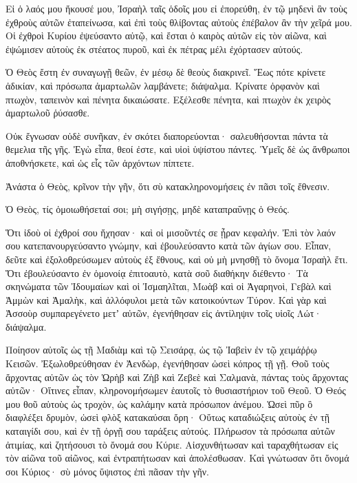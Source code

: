 \begin{spacing}{1.1}
\begin{multicols}{2}
Εἰ ὁ λαός μου ἤκουσέ μου, Ἰσραὴλ ταῖς ὁδοῖς μου εἰ ἐπορεύθη,
ἐν τῷ μηδενὶ ἂν τοὺς ἐχθροὺς αὐτῶν ἐταπείνωσα, καὶ ἐπὶ τοὺς θλίβοντας αὐτοὺς ἐπέβαλον ἂν τὴν χεῖρά μου.
Οἱ ἐχθροὶ Κυρίου ἐψεύσαντο αὐτῷ, καὶ ἔσται ὁ καιρὸς αὐτῶν εἰς τὸν αἰῶνα,
καὶ ἐψώμισεν αὐτοὺς ἐκ στέατος πυροῦ, καὶ ἐκ πέτρας μέλι ἐχόρτασεν αὐτούς.

Ὁ Θεὸς ἔστη ἐν συναγωγῇ θεῶν, ἐν μέσῳ δὲ θεοὺς διακρινεῖ.
Ἕως πότε κρίνετε ἀδικίαν, καὶ πρόσωπα ἁμαρτωλῶν λαμβάνετε; διάψαλμα.
Κρίνατε ὀρφανὸν καὶ πτωχὸν, ταπεινὸν καὶ πένητα δικαιώσατε.
Εξέλεσθε πένητα, καὶ πτωχὸν ἐκ χειρὸς ἁμαρτωλοῦ ῥύσασθε.

Οὐκ ἔγνωσαν οὐδὲ συνῆκαν, ἐν σκότει διαπορεύονται· σαλευθήσονται πάντα τὰ θεμελια τῆς γῆς.
Ἐγὼ εἶπα, θεοί ἐστε, καὶ υἱοὶ ὑψίστου πάντες.
Ὑμεῖς δὲ ὡς ἄνθρωποι ἀποθνήσκετε, καὶ ὡς εἷς τῶν ἀρχόντων πίπτετε.

Ἀνάστα ὁ Θεὸς, κρῖνον τὴν γῆν, ὅτι σὺ κατακληρονομήσεις ἐν πᾶσι τοῖς ἔθνεσιν.

Ὁ Θεὸς, τίς ὁμοιωθήσεταί σοι; μὴ σιγήσῃς, μηδὲ καταπραΰνῃς ὁ Θεός.

Ὅτι ἰδοὺ οἱ ἐχθροί σου ἤχησαν· καὶ οἱ μισοῦντές σε ᾖραν κεφαλήν.
Ἐπὶ τὸν λαόν σου κατεπανουργεύσαντο γνώμην, καὶ ἐβουλεύσαντο κατὰ τῶν ἁγίων σου.
Εἶπαν, δεῦτε καὶ ἐξολοθρεύσωμεν αὐτοὺς ἐξ ἔθνους, καὶ οὐ μὴ μνησθῇ τὸ ὄνομα Ἰσραὴλ ἔτι.
Ὅτι ἐβουλεύσαντο ἐν ὁμονοίᾳ ἐπιτοαυτὸ, κατὰ σοῦ διαθήκην διέθεντο·
Τὰ σκηνώματα τῶν Ἰδουμαίων καὶ οἱ Ἰσμαηλῖται, Μωὰβ καὶ οἱ Ἀγαρηνοὶ,
Γεβὰλ καὶ Ἀμμὼν καὶ Ἀμαλὴκ, καὶ ἀλλόφυλοι μετὰ τῶν κατοικούντων Τύρον.
Καὶ γὰρ καὶ Ἀσσοὺρ συμπαρεγένετο μετʼ αὐτῶν, ἐγενήθησαν εἰς ἀντίληψιν τοῖς υἱοῖς Λώτ· διάψαλμα.

Ποίησον αὐτοῖς ὡς τῇ Μαδιὰμ καὶ τῷ Σεισάρᾳ, ὡς τῷ Ἰαβεὶν ἐν τῷ χειμάῤῥῳ Κεισῶν.
Ἐξωλοθρεύθησαν ἐν Ἀενδὼρ, ἐγενήθησαν ὡσεὶ κόπρος τῇ γῇ.
Θοῦ τοὺς ἄρχοντας αὐτῶν ὡς τὸν Ὠρὴβ καὶ Ζὴβ καὶ Ζεβεὲ καὶ Σαλμανὰ, πάντας τοὺς ἄρχοντας αὐτῶν·
Οἵτινες εἶπαν, κληρονομήσωμεν ἑαυτοῖς τὸ θυσιαστήριον τοῦ Θεοῦ.
Ὁ Θεός μου θοῦ αὐτοὺς ὡς τροχὸν, ὡς καλάμην κατὰ πρόσωπον ἀνέμου.
Ὡσεὶ πῦρ ὃ διαφλέξει δρυμὸν, ὡσεὶ φλὸξ κατακαύσαι ὄρη·
Οὕτως καταδιώξεις αὐτοὺς ἐν τῇ καταιγίδι σου, καὶ ἐν τῇ ὀργῇ σου ταράξεις αὐτούς.
Πλήρωσον τὰ πρόσωπα αὐτῶν ἀτιμίας, καὶ ζητήσουσι τὸ ὄνομά σου Κύριε.
Αἰσχυνθήτωσαν καὶ ταραχθήτωσαν εἰς τὸν αἰῶνα τοῦ αἰῶνος, καὶ ἐντραπήτωσαν καὶ ἀπολέσθωσαν.
Καὶ γνώτωσαν ὅτι ὄνομά σοι Κύριος· σὺ μόνος ὕψιστος ἐπὶ πᾶσαν τὴν γῆν.


\end{multicols}
\end{spacing}
